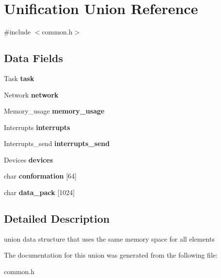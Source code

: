 \hypertarget{union_unification}{}\section{Unification Union Reference}
\label{union_unification}


{\ttfamily \#include $<$common.\+h$>$}

\subsection*{Data Fields}
\begin{DoxyCompactItemize}
\item 
Task {\bfseries task}\hypertarget{union_unification_a8bcc572b9d73774627be66dd46aa61a8}{}\label{union_unification_a8bcc572b9d73774627be66dd46aa61a8}

\item 
Network {\bfseries network}\hypertarget{union_unification_a2d9a64328e83ad37af17cbeb5e73b5df}{}\label{union_unification_a2d9a64328e83ad37af17cbeb5e73b5df}

\item 
Memory\+\_\+usage {\bfseries memory\+\_\+usage}\hypertarget{union_unification_a0d195ecd71403dc808aad5e3afe6e7e7}{}\label{union_unification_a0d195ecd71403dc808aad5e3afe6e7e7}

\item 
Interrupts {\bfseries interrupts}\hypertarget{union_unification_ab342d93ebde06a9e9d859f79b5d2b6f9}{}\label{union_unification_ab342d93ebde06a9e9d859f79b5d2b6f9}

\item 
Interrupts\+\_\+send {\bfseries interrupts\+\_\+send}\hypertarget{union_unification_aa483e870c9c6607cd35e04e435cb37b3}{}\label{union_unification_aa483e870c9c6607cd35e04e435cb37b3}

\item 
Devices {\bfseries devices}\hypertarget{union_unification_ac451518cc6db3023ae782d6456bd29c5}{}\label{union_unification_ac451518cc6db3023ae782d6456bd29c5}

\item 
char {\bfseries conformation} \mbox{[}64\mbox{]}\hypertarget{union_unification_a51d4db27aea0ab484c4f111f9cebb890}{}\label{union_unification_a51d4db27aea0ab484c4f111f9cebb890}

\item 
char {\bfseries data\+\_\+pack} \mbox{[}1024\mbox{]}\hypertarget{union_unification_a9dc75448acbba57f2e38cf112d2a0f5c}{}\label{union_unification_a9dc75448acbba57f2e38cf112d2a0f5c}

\end{DoxyCompactItemize}


\subsection{Detailed Description}
union data structure that uses the same memory space for all elements 

The documentation for this union was generated from the following file\+:\begin{DoxyCompactItemize}
\item 
common.\+h\end{DoxyCompactItemize}

